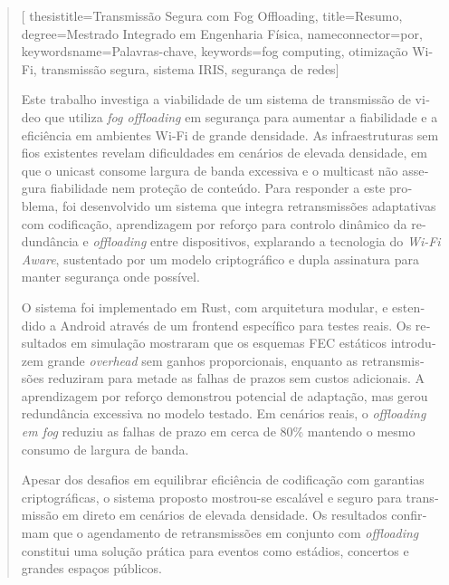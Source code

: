 \begin{abstract}[
	thesistitle={Transmissão Segura com Fog Offloading},
	title={Resumo},
	degree={Mestrado Integrado em Engenharia Física},
	nameconnector={por},
        keywordsname={Palavras-chave},
        keywords={fog computing, otimização Wi-Fi, transmissão segura, sistema IRIS, segurança de redes}]
\begin{otherlanguage}{portuguese}

\quad Este trabalho investiga a viabilidade de um sistema de transmissão de video que utiliza \textit{fog offloading} em segurança para aumentar a fiabilidade e a eficiência em ambientes Wi-Fi de grande densidade. As infraestruturas sem fios existentes revelam dificuldades em cenários de elevada densidade, em que o unicast consome largura de banda excessiva e o multicast não assegura fiabilidade nem proteção de conteúdo. Para responder a este problema, foi desenvolvido um sistema que integra retransmissões adaptativas com codificação, aprendizagem por reforço para controlo dinâmico da redundância e \textit{offloading} entre dispositivos, explarando a tecnologia do \textit{Wi-Fi Aware}, sustentado por um modelo criptográfico e dupla assinatura para manter segurança onde possível.

\quad O sistema foi implementado em Rust, com arquitetura modular, e estendido a Android através de um frontend específico para testes reais. Os resultados em simulação mostraram que os esquemas FEC estáticos introduzem grande \textit{overhead} sem ganhos proporcionais, enquanto as retransmissões reduziram para metade as falhas de prazos sem custos adicionais. A aprendizagem por reforço demonstrou potencial de adaptação, mas gerou redundância excessiva no modelo testado. Em cenários reais, o \textit{offloading em fog} reduziu as falhas de prazo em cerca de 80\% mantendo o mesmo consumo de largura de banda.

\quad Apesar dos desafios em equilibrar eficiência de codificação com garantias criptográficas, o sistema proposto mostrou-se escalável e seguro para transmissão em direto em cenários de elevada densidade. Os resultados confirmam que o agendamento de retransmissões em conjunto com \textit{offloading} constitui uma solução prática para eventos como estádios, concertos e grandes espaços públicos.


	
\end{otherlanguage}
\end{abstract}
